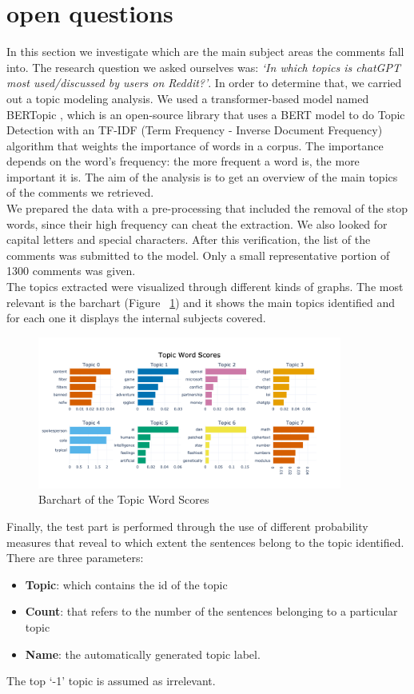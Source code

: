\documentclass[sigchi]{acmart}
\begin{document}
\section{open questions}
In this section we investigate which are the main subject areas the comments fall into. The research question we asked ourselves was: \textit{`In which topics is chatGPT most used/discussed by users on Reddit?'}. In order to determine that, we carried out a topic modeling analysis. We used a transformer-based model named BERTopic \cite{BERTopic}, which is an open-source library that uses a BERT model to do Topic Detection with an TF-IDF (Term Frequency - Inverse Document Frequency) algorithm that weights the importance of words in a corpus. The importance depends on the word's frequency: the more frequent a word is, the more important it is. The aim of the analysis is to get an overview of the main topics of the comments we retrieved.\\

We prepared the data with a pre-processing that included the removal of the stop words, since their high frequency can cheat the extraction. We also looked for capital letters and special characters. After this verification, the list of the comments was submitted to the model. 
Only a small representative portion of 1300 comments was given. \\ The topics extracted were visualized through different kinds of graphs. The most relevant is the barchart (Figure ~\ref{fig:immagine_bar}) and it shows the main topics identified and for each one it displays the internal subjects covered. 



\begin{figure}[H]
  \centering
  \includegraphics[height=5cm]{barchart.png}
  \caption{Barchart of the Topic Word Scores}
  \label{fig:immagine_bar}
\end{figure}



Finally, the test part is performed through the use of different probability measures that reveal to which extent the sentences belong to the topic identified. There are three parameters:
\begin{itemize}
  \item \textbf{Topic}: which contains the id of the topic
  \item \textbf{Count}: that refers to the number of the sentences belonging to a particular topic
  \item \textbf{Name}: the automatically generated topic label. 
\end{itemize}The top `-1' topic is assumed as irrelevant.  
\end{document}
